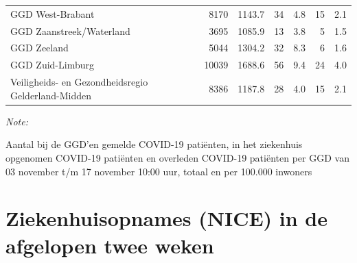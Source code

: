\documentclass[
  english,
  man,floatsintext]{apa6}
\begin{document}
\begin{table}
\begin{threeparttable}
\begin{tabular}{lrrrrrr}
GGD West-Brabant & 8170 & 1143.7 & 34 & 4.8 & 15 & 2.1\\
GGD Zaanstreek/Waterland & 3695 & 1085.9 & 13 & 3.8 & 5 & 1.5\\
GGD Zeeland & 5044 & 1304.2 & 32 & 8.3 & 6 & 1.6\\
GGD Zuid-Limburg & 10039 & 1688.6 & 56 & 9.4 & 24 & 4.0\\
Veiligheids- en Gezondheidsregio Gelderland-Midden & 8386 & 1187.8 & 28 & 4.0 & 15 & 2.1\\
\bottomrule
\end{tabular}
\begin{tablenotes}
\item \textit{Note: } 
\item Aantal bij de GGD’en gemelde COVID-19 patiënten, in het ziekenhuis opgenomen COVID-19 patiënten en overleden COVID-19 patiënten per GGD van 03 november t/m 17 november 10:00 uur, totaal en per 100.000 inwoners
\end{tablenotes}
\end{threeparttable}
\endgroup{}
\end{table}

\newpage

\hypertarget{ziekenhuisopnames-nice-in-de-afgelopen-twee-weken}{%
\section{Ziekenhuisopnames (NICE) in de afgelopen twee weken}\label{ziekenhuisopnames-nice-in-de-afgelopen-twee-weken}}
\end{document}
